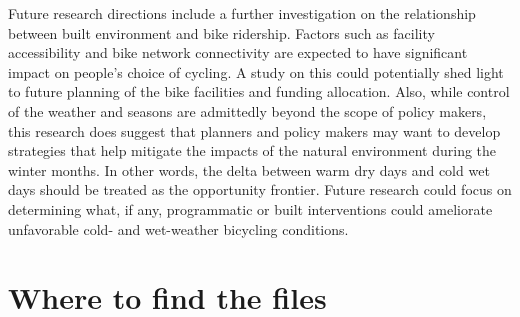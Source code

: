 \documentclass [11pt, proquest] {uwthesis}[2015/03/03]
\begin{document}
Future research directions include a further investigation on the relationship between built environment and bike ridership. Factors such as facility accessibility and bike network connectivity are expected to have significant impact on people's choice of cycling. A study on this could potentially shed light to future planning of the bike facilities and funding allocation. Also, while control of the weather and seasons are admittedly beyond the scope of policy makers,
this research does suggest that planners and policy makers may want to develop strategies that help mitigate the impacts of the natural environment during the winter months. In other words, the delta between warm dry days and cold wet days should be treated as the opportunity frontier. Future research could focus on determining what, if any, programmatic or built interventions could ameliorate unfavorable cold- and wet-weather bicycling conditions.


%
%



%
%
\appendix
\raggedbottom\sloppy
 
 
\chapter{Where to find the files}
 

\end{document}
